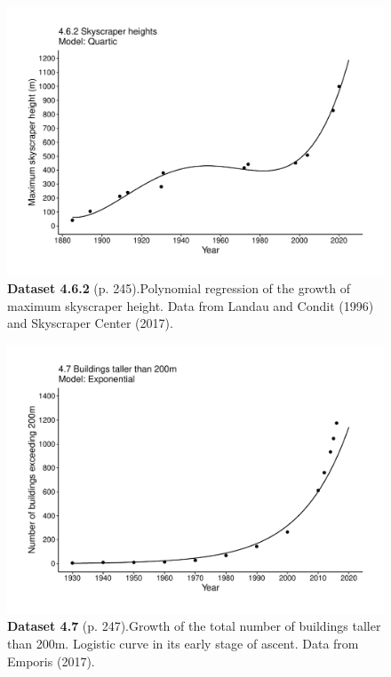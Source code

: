 \documentclass[aps,rmp,preprint,superscriptaddress,10pt,onecolumn]{article}
\begin{document}
\clearpage
\begin{figure}[h]
\includegraphics[width=\textwidth]{output/figs-ggplot/4.6.2.pdf}
\caption*{\textbf{Dataset 4.6.2} (p. 245).Polynomial regression of the growth of maximum skyscraper height. Data from Landau and Condit (1996) and Skyscraper Center (2017). }
\end{figure}
	
\clearpage
\begin{figure}[h]
\includegraphics[width=\textwidth]{output/figs-ggplot/4.7.pdf}
\caption*{\textbf{Dataset 4.7} (p. 247).Growth of the total number of buildings taller than 200m. Logistic curve in its early stage of ascent. Data from Emporis (2017).}
\end{figure}
	
\end{document}
